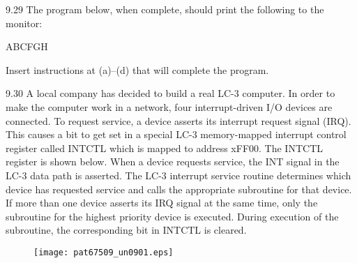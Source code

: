 \documentclass{patt}
\begin{document}
\begin{exercises}
\begin{colorverbatim}
\end{colorverbatim}

\item[9.29] The program below, when complete, should print the following to the monitor:
\begin{center}
ABCFGH
\end{center}

Insert instructions at (a)--(d) that will complete the program.

\item[9.30] A local company has decided to build a real LC-3 computer.
  In order to make the computer work in a network, four
  interrupt-driven I/O devices are connected. To request service, a
  device asserts its interrupt request signal (IRQ). This causes a bit
  to get set in a special LC-3 memory-mapped interrupt control
  register called INTCTL which is mapped to address xFF00. The INTCTL
  register is shown below. When a device requests service, the INT
  signal in the LC-3 data path is asserted.  The LC-3 interrupt
  service routine determines which device has requested service and
  calls the appropriate subroutine for that device.  If more than one
  device asserts its IRQ signal at the same time, only the subroutine
  for the highest priority device is executed.  During execution of
  the subroutine, the corresponding bit in INTCTL is cleared.

\begin{figure}[!h]
\centerline{\texttt{[image: pat67509\_un0901.eps]}}
\end{figure}


\end{exercises}
\end{document}
